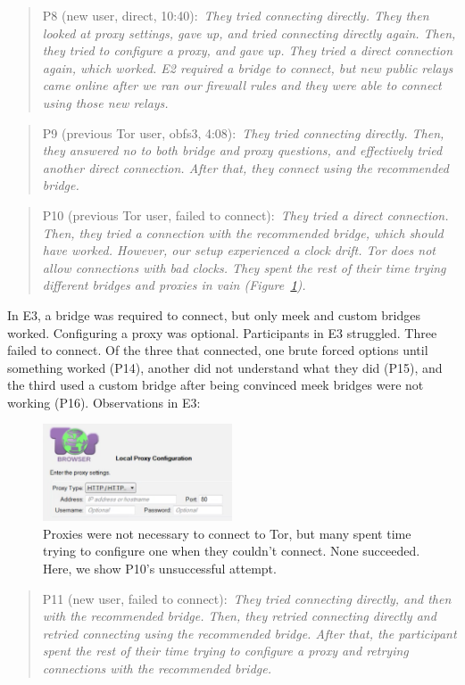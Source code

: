 \documentclass[USenglish,oneside,twocolumn]{article}
\newcommand{\pquote}[2]{
\begin{quotation}
\noindent #1:~\textit{#2}
\end{quotation}
}
\begin{document}
\pquote{P8 (new user, direct, 10:40)}{They tried connecting directly. They then looked at proxy settings, gave up, and tried connecting directly again. Then, they tried to configure a proxy, and gave up. They tried a direct connection again, which worked. E2 required a bridge to connect, but new public relays came online after we ran our firewall rules and they were able to connect using those new relays.}

\pquote{P9 (previous Tor user, obfs3, 4:08)}{They tried connecting directly. Then, they answered no to both bridge and proxy questions, and effectively tried another direct connection. After that, they connect using the recommended bridge.}

\pquote{P10 (previous Tor user, failed to connect)}{They tried a direct connection. Then, they tried a connection with the recommended bridge, which should have worked. However, our setup experienced a clock drift. Tor does not allow connections with bad clocks. They spent the rest of their time trying different bridges and proxies in vain (Figure~\ref{fig:proxy-attempt}).}

In E3, a bridge was required to connect, but only meek and custom bridges worked. Configuring a proxy was optional.
Participants in E3 struggled. Three failed to connect. Of the three that connected, one brute forced options until something worked (P14), another did not understand what they did (P15), and the third used a custom bridge after being convinced meek bridges were not working (P16).
Observations in E3: 

\begin{figure}[t]
\centering
\includegraphics[width=0.5\textwidth]{P8-proxy-attempt.png}
\caption{
Proxies were not necessary to connect to Tor, but many spent time trying to configure one when they couldn't connect. None succeeded. Here, we show P10's unsuccessful attempt. 
}
\label{fig:proxy-attempt}
\end{figure}

\pquote{P11 (new user, failed to connect)}{They tried connecting directly, and then with the recommended bridge. Then, they retried connecting directly and retried connecting using the recommended bridge. After that, the participant spent the rest of their time trying to configure a proxy and retrying connections with the recommended bridge.}
\end{document}
